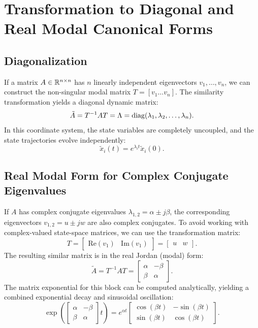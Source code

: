 \section{Transformation to Diagonal and Real Modal Canonical Forms}

\subsection{Diagonalization}
If a matrix $A \in \mathbb{R}^{n \times n}$ has $n$ linearly independent eigenvectors $v_1, \dots, v_n$, we can construct the non-singular modal matrix $T = [v_1 \dots v_n]$. The similarity transformation yields a diagonal dynamic matrix:
\begin{equation}
\tilde{A} = T^{-1} A T = \Lambda = \operatorname{diag}(\lambda_1, \lambda_2, \dots, \lambda_n) .
\end{equation}
In this coordinate system, the state variables are completely uncoupled, and the state trajectories evolve independently:
\begin{equation}
\tilde{x}_i(t) = e^{\lambda_i t} \tilde{x}_i(0) .
\end{equation}

\subsection{Real Modal Form for Complex Conjugate Eigenvalues}
If $A$ has complex conjugate eigenvalues $\lambda_{1,2} = \alpha \pm j \beta$, the corresponding eigenvectors $v_{1,2} = u \pm j w$ are also complex conjugates. To avoid working with complex-valued state-space matrices, we can use the transformation matrix:
\begin{equation}
T = \begin{bmatrix} \text{Re}(v_1) & \text{Im}(v_1) \end{bmatrix} = \begin{bmatrix} u & w \end{bmatrix} .
\end{equation}
The resulting similar matrix is in the real Jordan (modal) form:
\begin{equation}
\tilde{A} = T^{-1} A T = \begin{bmatrix} \alpha & -\beta \\ \beta & \alpha \end{bmatrix} .
\end{equation}
The matrix exponential for this block can be computed analytically, yielding a combined exponential decay and sinusoidal oscillation:
\begin{equation}
\exp\left( \begin{bmatrix} \alpha & -\beta \\ \beta & \alpha \end{bmatrix} t \right) = e^{\alpha t} \begin{bmatrix} \cos(\beta t) & -\sin(\beta t) \\ \sin(\beta t) & \cos(\beta t) \end{bmatrix} .
\end{equation}

